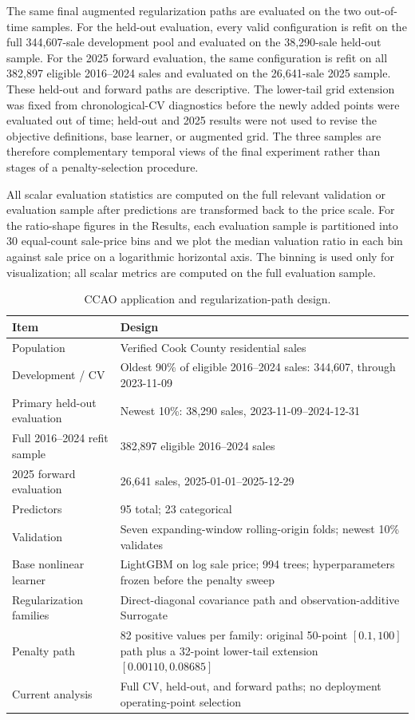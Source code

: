 \documentclass[10pt]{article}
\theoremstyle{definition}
\newcommand{\1}{\mathbf{1}}
\begin{document}
The same final augmented regularization paths are evaluated on the two out-of-time samples. For the held-out evaluation, every valid configuration is refit on the full
344,607-sale development pool and evaluated on the 38,290-sale held-out sample. For
the 2025 forward evaluation, the same configuration is refit on all 382,897 eligible
2016--2024 sales and evaluated on the 26,641-sale 2025 sample. 
These held-out and forward paths are descriptive. The lower-tail grid extension was fixed from chronological-CV diagnostics before the newly added points were evaluated out of time; held-out and 2025 results were not used to revise the objective definitions, base learner, or augmented grid. The three samples are therefore complementary temporal views of the final experiment rather than stages of a penalty-selection procedure.

All scalar evaluation statistics are computed on the full relevant validation or
evaluation sample after predictions are transformed back to the price scale. For
the ratio-shape figures in the Results, each evaluation sample is partitioned into
30 equal-count sale-price bins and we plot the median valuation ratio in each bin
against sale price on a logarithmic horizontal axis. The binning is used only for
visualization; all scalar metrics are computed on the full evaluation sample.

\begin{table}[t]
\centering
\caption{CCAO application and regularization-path design.}
\label{tab:ccao_design}
\begin{tabularx}{\textwidth}{@{}p{3.5cm}X@{}}
\toprule
Item & Design \\
\midrule
Population & Verified Cook County residential sales \\
Development / CV & Oldest 90\% of eligible 2016--2024 sales: 344,607, through 2023-11-09 \\
Primary held-out evaluation & Newest 10\%: 38,290 sales, 2023-11-09--2024-12-31 \\
Full 2016--2024 refit sample & 382,897 eligible 2016--2024 sales \\
2025 forward evaluation & 26,641 sales, 2025-01-01--2025-12-29 \\
Predictors & 95 total; 23 categorical \\
Validation & Seven expanding-window rolling-origin folds; newest 10\% validates \\
Base nonlinear learner & LightGBM on log sale price; 994 trees; hyperparameters frozen before the penalty sweep \\
Regularization families & Direct-diagonal covariance path and observation-additive Surrogate \\
Penalty path & 82 positive values per family: original 50-point $[0.1,100]$ path plus a 32-point lower-tail extension $[0.00110,0.08685]$ \\
Current analysis & Full CV, held-out, and forward paths; no deployment operating-point selection \\
\bottomrule
\end{tabularx}
\end{table}
\end{document}
